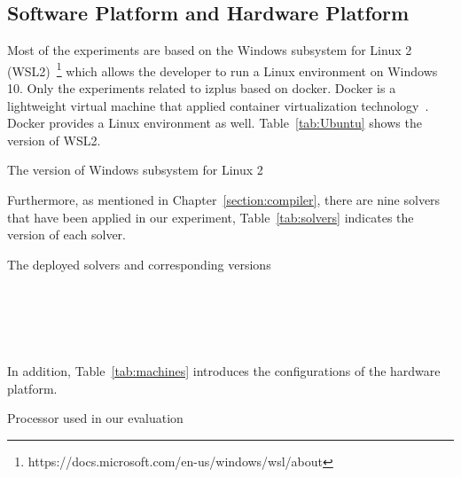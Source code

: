 \subsection{Software Platform and Hardware Platform}
\label{sec:softplat}
Most of the experiments are based on the Windows subsystem for Linux 2 (WSL2)~\footnote{https://docs.microsoft.com/en-us/windows/wsl/about} which allows the developer to run a Linux environment on Windows 10. Only the experiments related to izplus based on docker. Docker is a lightweight virtual machine that applied container virtualization technology~\cite{r25}. Docker provides a Linux environment as well. Table~\ref{tab:Ubuntu} shows the version of WSL2.
\begin{table}[htbp]
  \centering

  \caption{The version of Windows subsystem for Linux 2}
  
  \label{tab:Ubuntu}
  
\end{table}
Furthermore, as mentioned in Chapter~\ref{section:compiler}, there are nine solvers that have been applied in our experiment, Table~\ref{tab:solvers} indicates the version of each solver.
\begin{table}[htbp]
  \centering

  \caption{The deployed solvers and corresponding versions}
  
  \label{tab:solvers}
  	\begin{subtable}[b]{\textwidth}
  	\centering
  
    \end{subtable}\\
    	\begin{subtable}[b]{\textwidth}
  	\centering
  
  \end{subtable}\\
  \begin{subtable}[b]{\textwidth}
  \centering
  
  \end{subtable}
\end{table}
\\In addition, Table~\ref{tab:machines} introduces the configurations of the hardware platform.
\begin{table}[H]
  \centering

  \caption{Processor used in our evaluation}
  
  \label{tab:machines}
  
\end{table}
